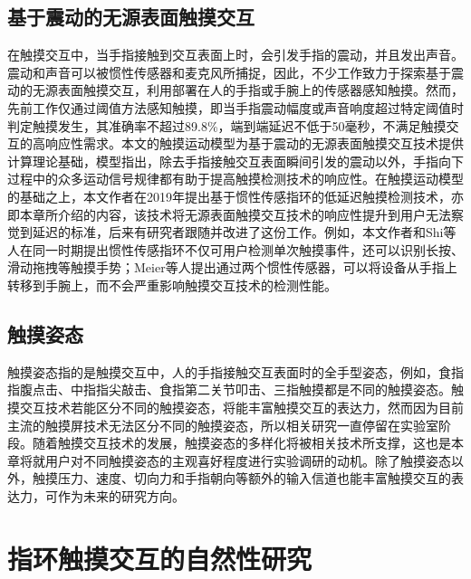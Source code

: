 \subsection{基于震动的无源表面触摸交互}

在触摸交互中，当手指接触到交互表面上时，会引发手指的震动，并且发出声音。震动和声音可以被惯性传感器和麦克风所捕捉，因此，不少工作致力于探索基于震动的无源表面触摸交互，利用部署在人的手指\cite{gu2019accurate, shi2020ready, gu2020qwertyring}或手腕\cite{meier2021tapld}上的传感器感知触摸。然而，先前工作仅通过阈值方法感知触摸\cite{lam2002mids, oh2017anywheretouch, niikura2014anywhere}，即当手指震动幅度或声音响度超过特定阈值时判定触摸发生，其准确率不超过89.8\%，端到端延迟不低于50毫秒，不满足触摸交互的高响应性需求。本文的触摸运动模型为基于震动的无源表面触摸交互技术提供计算理论基础，模型指出，除去手指接触交互表面瞬间引发的震动以外，手指向下过程中的众多运动信号规律都有助于提高触摸检测技术的响应性。在触摸运动模型的基础之上，本文作者在2019年提出基于惯性传感指环的低延迟触摸检测技术\cite{gu2019accurate}，亦即本章所介绍的内容，该技术将无源表面触摸交互技术的响应性提升到用户无法察觉到延迟的标准，后来有研究者跟随并改进了这份工作。例如，本文作者和Shi等人在同一时期提出惯性传感指环不仅可用户检测单次触摸事件，还可以识别长按、滑动拖拽等触摸手势\cite{gu2020qwertyring, shi2020ready}；Meier等人提出通过两个惯性传感器，可以将设备从手指上转移到手腕上\cite{meier2021tapld}，而不会严重影响触摸交互技术的检测性能。

\subsection{触摸姿态}

触摸姿态指的是触摸交互中，人的手指接触交互表面时的全手型姿态，例如，食指指腹点击、中指指尖敲击、食指第二关节叩击、三指触摸都是不同的触摸姿态。触摸交互技术若能区分不同的触摸姿态，将能丰富触摸交互的表达力\cite{cao2008shapetouch, harrison2011tapsense}，然而因为目前主流的触摸屏技术无法区分不同的触摸姿态，所以相关研究一直停留在实验室阶段。随着触摸交互技术的发展，触摸姿态的多样化将被相关技术所支撑，这也是本章将就用户对不同触摸姿态的主观喜好程度进行实验调研的动机。除了触摸姿态以外，触摸压力\cite{ramos2004pressure}、速度\cite{heo2011forcetap, iwasaki2009expressive}、切向力\cite{heo2011force}和手指朝向\cite{roudaut2009microrolls, xiao2015estimating}等额外的输入信道也能丰富触摸交互的表达力，可作为未来的研究方向。

\section{指环触摸交互的自然性研究}

